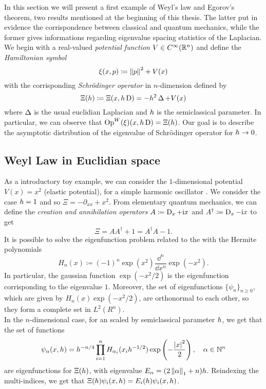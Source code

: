 \label{sec:weyl_and_egorov}

In this section we will present a first example of Weyl's law and Egorov's theorem, two results mentioned at the beginning of this thesis. The latter put in evidence the corrispondence between classical and quantum mechanics, while the former gives informations regarding eigenvalue spacing statistics of the Laplacian. We begin with a real-valued \emph{potential function} $V\in C^{\infty}(\mathbb{R}^{n})$ and define the \emph{Hamiltonian symbol}
\begin{equation}
\label{eq:ham_symbol}
\operatorname{\xi}(x,p)\coloneqq\left\lVert p\right\rVert^{2}+V(x)
\end{equation} 
with the corrisponding \emph{Schr{\"o}dinger operator} in $n$-dimension defined by
\begin{equation}
\label{eq:schrod_operator}
\Xi(h)\coloneqq\Xi(x,h\operatorname{D})=-h^{2}\operatorname{\Delta}+V(x)
\end{equation}
where $\operatorname{\Delta}$ is the usual euclidian Laplacian and $h$ is the semiclassical parameter. In particular, we can observe that $\operatorname{Op}^{W}(\xi)(x,h\operatorname{D})=\Xi(h)$. Our goal is to describe the asymptotic distribution of the eigenvalue of Schr{\"o}dinger operator for $h\to 0$.


\subsection{Weyl Law in Euclidian space}

As a introductory toy example, we can consider the $1$-dimensional potential $V(x)=x^{2}$ (elastic potential), for a simple harmonic oscillator \HO. We consider the case $h=1$ and so $\Xi=-\partial_{xx}+x^{2}$. From elementary quantum mechanics, we can define the \emph{creation and annihilation operators} $A\coloneqq \operatorname{D}_{x}+\mathrm{i} x$ and $A^{\dagger}\coloneqq\operatorname{D}_{x}-\mathrm{i} x$ to get 
\[
\Xi=AA^{\dagger}+1=A^{\dagger}A-1.
\]
It is possible to solve the eigenfunction problem related to the \HO with the Hermite polynomials 
\[
H_{n}(x)\coloneqq(-1)^{n}\exp(x^{2})\frac{\dd^{n}}{\dd x^{n}}\exp(-x^{2}).
\]
In particular, the gaussian function $\exp(-x^{2}/2)$ is the eigenfunction corrisponding to the eigenvalue $1$. Moreover, the set of eigenfunctions $\{\psi_{n}\}_{n\geq0}$, which are given by $H_{n}(x)\exp(-x^{2}/2)$, are orthonormal to each other, so they form a complete set in $L^{2}(R^{n})$.\\
In the $n$-dimensional case, for an \HO scaled by semiclassical parameter $h$, we get that the set of functions
\[
\psi_{\alpha}(x,h)=h^{-n/4}\prod_{i=1}^{n}H_{\alpha_{i}}(x_{i}h^{-1/2})\exp\left(-\frac{\left| x\right|^{2}}{2}\right)
,\quad\alpha\in \mathbb{N}^{n}
\]
are eigenfunctions for $\Xi(h)$, with eigenvalue $E_{\alpha}=(2\left\lVert \alpha\right\rVert_{1}+n)h$. Reindexing the multi-indices, we get that $\Xi(h)\psi_{i}(x,h)=E_{i}(h)\psi_{i}(x,h)$.


